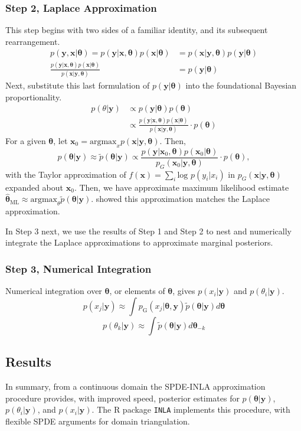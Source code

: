 \subsubsection{Step 2, Laplace Approximation}  %

This step begins with two sides of a familiar identity, and its subsequent rearrangement.
\begin{align}
p(\pmb{y} , \pmb{x} | \pmb{\theta}) = p(\pmb{y} | \pmb{x}, \pmb{\theta}) p(\pmb{x} | \pmb{\theta})  &= p(\pmb{x} | \pmb{y}, \pmb{\theta}) p(\pmb{y} | \pmb{\theta}) \\
\frac{p(\pmb{y} | \pmb{x}, \pmb{\theta}) p(\pmb{x} | \pmb{\theta})} {p(\pmb{x} | \pmb{y}, \pmb{\theta})} &= p(\pmb{y} | \pmb{\theta})  
\end{align}
Next, substitute this last formulation of $p(\pmb{y}|\pmb{\theta})$ into the foundational Bayesian proportionality.
\begin{align}
p(\theta|\pmb{y}) & \propto p(\pmb{y}|\pmb{\theta})p(\pmb{\theta}) \\
& \propto \frac{p(\pmb{y} | \pmb{x}, \pmb{\theta}) p(\pmb{x} | \pmb{\theta})}{p(\pmb{x} | \pmb{y}, \pmb{\theta})} \cdot p(\pmb{\theta})
\end{align}
For a given $\pmb{\theta}$, let $\pmb{x}_{0} = \text{argmax}_{x}p(\pmb{x}|\pmb{y},\pmb{\theta})$. Then,
$$ p(\pmb{\theta}|\pmb{y}) \approx \tilde{p}(\pmb{\theta}|\pmb{y}) \propto  \frac{p(\pmb{y} | \pmb{x}_{0}, \pmb{\theta}) p(\pmb{x}_{0} | \pmb{\theta})}{p_{G}(\pmb{x}_{0} | \pmb{y}, \pmb{\theta})} \cdot p(\pmb{\theta}),$$
with the Taylor approximation of $f(\pmb{x}) = \sum_{i} \text{log }p(y_{i}|x_{i})$ in $p_{G}(\pmb{x} | \pmb{y}, \pmb{\theta})$ expanded about $\pmb{x}_{0}$. Then, we have approximate maximum likelihood estimate $\hat{\pmb{\theta}}_{\text{ML}} \approx \text{argmax}_{\theta} \tilde{p}(\pmb{\theta}|\pmb{y})$. \cite{Tierney1986} showed this approximation matches the Laplace approximation. 

In Step 3 next, we use the results of Step 1 and Step 2 to nest and numerically integrate the Laplace approximations to approximate marginal posteriors.

\subsubsection{Step 3, Numerical Integration} %
Numerical integration over $\pmb{\theta}$, or elements of $\pmb{\theta}$, gives $p(x_{i}|\pmb{y})$ and $p(\theta_{i}|\pmb{y})$.
        $$ p(x_{j} | \pmb{y}) \approx \int p_{\text{G}}(x_{j}|\pmb{\theta, y})\tilde{p}(\pmb{\theta}|\pmb{y}) d\pmb{\theta} $$
        $$ p(\theta_{k} | \pmb{y}) \approx \int \tilde{p}(\pmb{\theta}|\pmb{y}) d\pmb{\theta}_{-k} $$
        


\subsection{Results}
In summary, from a continuous domain the SPDE-INLA approximation procedure provides, with improved speed, posterior estimates for $p(\pmb{\theta}|\pmb{y})$, $p(\theta_{i}|\pmb{y})$, and $p(x_{i}|\pmb{y})$. The R package \verb|INLA| implements this procedure, with flexible SPDE arguments for domain triangulation.